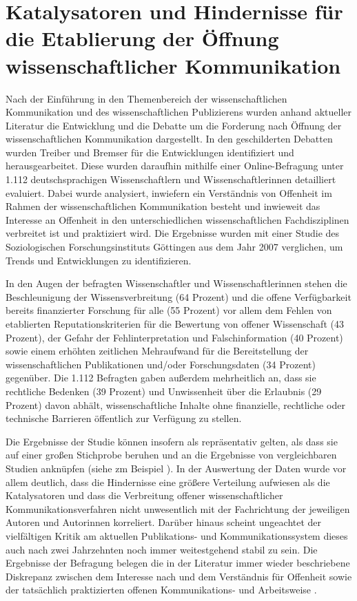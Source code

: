 \section{Katalysatoren und Hindernisse für die Etablierung der Öffnung wissenschaftlicher Kommunikation}

Nach der Einführung in den Themenbereich der wissenschaftlichen Kommunikation und des wissenschaftlichen Publizierens wurden anhand aktueller Literatur die Entwicklung und die Debatte um die Forderung nach Öffnung der wissenschaftlichen Kommunikation dargestellt. In den geschilderten Debatten wurden Treiber und Bremser für die Entwicklungen identifiziert und herausgearbeitet. Diese wurden daraufhin mithilfe einer Online-Befragung unter 1.112 deutschsprachigen Wissenschaftlern und Wissenschaftlerinnen detailliert evaluiert. Dabei wurde analysiert, inwiefern ein Verständnis von Offenheit im Rahmen der wissenschaftlichen Kommunikation besteht und inwieweit das Interesse an Offenheit in den unterschiedlichen wissenschaftlichen Fachdisziplinen verbreitet ist und praktiziert wird. Die Ergebnisse wurden mit einer Studie des Soziologischen Forschungsinstituts Göttingen aus dem Jahr 2007 verglichen, um Trends und Entwicklungen zu identifizieren.

In den Augen der befragten Wissenschaftler und Wissenschaftlerinnen stehen die Beschleunigung der Wissensverbreitung (64 Prozent) und die offene Verfügbarkeit bereits finanzierter Forschung für alle (55 Prozent) vor allem dem Fehlen von etablierten Reputationskriterien für die Bewertung von offener Wissenschaft (43 Prozent), der Gefahr der Fehlinterpretation und Falschinformation (40 Prozent) sowie einem erhöhten zeitlichen Mehraufwand für die Bereitstellung der wissenschaftlichen Publikationen und/oder Forschungsdaten (34 Prozent) gegenüber. Die 1.112 Befragten gaben außerdem mehrheitlich an, dass sie rechtliche Bedenken (39 Prozent) und Unwissenheit über die Erlaubnis (29 Prozent) davon abhält, wissenschaftliche Inhalte ohne finanzielle, rechtliche oder technische Barrieren öffentlich zur Verfügung zu stellen.

Die Ergebnisse der Studie können insofern als repräsentativ gelten, als dass sie auf einer großen Stichprobe beruhen und an die Ergebnisse von vergleichbaren Studien anknüpfen (siehe zm Beispiel \cite{Hanekop_2007}). In der Auswertung der Daten wurde vor allem deutlich, dass die Hindernisse eine größere Verteilung aufwiesen als die Katalysatoren und dass die Verbreitung offener wissenschaftlicher Kommunikationsverfahren nicht unwesentlich mit der Fachrichtung der jeweiligen Autoren und Autorinnen korreliert. Darüber hinaus scheint ungeachtet der vielfältigen Kritik am aktuellen Publikations- und Kommunikationssystem dieses auch nach zwei Jahrzehnten noch immer weitestgehend stabil zu sein. Die Ergebnisse der Befragung belegen die in der Literatur immer wieder beschriebene Diskrepanz zwischen dem Interesse nach und dem Verständnis für Offenheit sowie der tatsächlich praktizierten offenen Kommunikations- und Arbeitsweise \cite{Yiotis_2013} \cite{Bartling_2013} \cite{Hagner_2015} \cite{Fecher_2015}.

